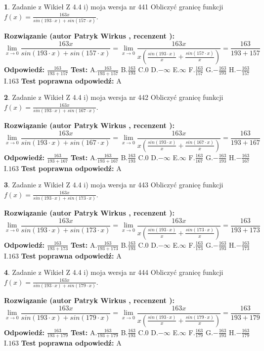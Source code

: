 \documentclass[12pt, a4paper]{article}
\theoremstyle{definition} %
\newtheorem{zad}{}
\newcommand{\zadStart}[1]{\begin{zad}#1\newline}
\newcommand{\zadStop}{\end{zad}}
\newcommand{\rozwStart}[2]{\noindent \textbf{Rozwiązanie (autor #1 , recenzent #2): }\newline}
\newcommand{\rozwStop}{\newline}
\newcommand{\odpStart}{\noindent \textbf{Odpowiedź:}\newline}
\newcommand{\odpStop}{\newline}
\newcommand{\testStart}{\noindent \textbf{Test:}\newline}
\newcommand{\testStop}{\newline}
\newcommand{\kluczStart}{\noindent \textbf{Test poprawna odpowiedź:}\newline}
\newcommand{\kluczStop}{\newline}
\begin{document}
\zadStart{Zadanie z Wikieł Z 4.4 i) moja wersja nr 441}
Obliczyć granicę funkcji $f(x)=\frac{163x}{sin(193\cdot x) +sin(157\cdot x)}$.
\zadStop
\rozwStart{Patryk Wirkus}{}
$$\lim\limits_{x\to 0}\frac{163x}{sin(193\cdot x) +sin(157\cdot x)}=\lim\limits_{x\to 0}\frac{163x}{x(\frac{sin(193\cdot x)}{x}+\frac{sin(157\cdot x)}{x})}=\frac{163}{193+157}$$
\rozwStop
\odpStart
$\frac{163}{193+157}$
\odpStop
\testStart
A.$\frac{163}{193+157}$
B.$\frac{163}{193}$
C.$0$
D.$-\infty$
E.$\infty$
F.$\frac{163}{157}$
G.$-\frac{163}{193}$
H.$-\frac{163}{157}$
I.$163$
\testStop
\kluczStart
A
\kluczStop



\zadStart{Zadanie z Wikieł Z 4.4 i) moja wersja nr 442}
Obliczyć granicę funkcji $f(x)=\frac{163x}{sin(193\cdot x) +sin(167\cdot x)}$.
\zadStop
\rozwStart{Patryk Wirkus}{}
$$\lim\limits_{x\to 0}\frac{163x}{sin(193\cdot x) +sin(167\cdot x)}=\lim\limits_{x\to 0}\frac{163x}{x(\frac{sin(193\cdot x)}{x}+\frac{sin(167\cdot x)}{x})}=\frac{163}{193+167}$$
\rozwStop
\odpStart
$\frac{163}{193+167}$
\odpStop
\testStart
A.$\frac{163}{193+167}$
B.$\frac{163}{193}$
C.$0$
D.$-\infty$
E.$\infty$
F.$\frac{163}{167}$
G.$-\frac{163}{193}$
H.$-\frac{163}{167}$
I.$163$
\testStop
\kluczStart
A
\kluczStop



\zadStart{Zadanie z Wikieł Z 4.4 i) moja wersja nr 443}
Obliczyć granicę funkcji $f(x)=\frac{163x}{sin(193\cdot x) +sin(173\cdot x)}$.
\zadStop
\rozwStart{Patryk Wirkus}{}
$$\lim\limits_{x\to 0}\frac{163x}{sin(193\cdot x) +sin(173\cdot x)}=\lim\limits_{x\to 0}\frac{163x}{x(\frac{sin(193\cdot x)}{x}+\frac{sin(173\cdot x)}{x})}=\frac{163}{193+173}$$
\rozwStop
\odpStart
$\frac{163}{193+173}$
\odpStop
\testStart
A.$\frac{163}{193+173}$
B.$\frac{163}{193}$
C.$0$
D.$-\infty$
E.$\infty$
F.$\frac{163}{173}$
G.$-\frac{163}{193}$
H.$-\frac{163}{173}$
I.$163$
\testStop
\kluczStart
A
\kluczStop



\zadStart{Zadanie z Wikieł Z 4.4 i) moja wersja nr 444}
Obliczyć granicę funkcji $f(x)=\frac{163x}{sin(193\cdot x) +sin(179\cdot x)}$.
\zadStop
\rozwStart{Patryk Wirkus}{}
$$\lim\limits_{x\to 0}\frac{163x}{sin(193\cdot x) +sin(179\cdot x)}=\lim\limits_{x\to 0}\frac{163x}{x(\frac{sin(193\cdot x)}{x}+\frac{sin(179\cdot x)}{x})}=\frac{163}{193+179}$$
\rozwStop
\odpStart
$\frac{163}{193+179}$
\odpStop
\testStart
A.$\frac{163}{193+179}$
B.$\frac{163}{193}$
C.$0$
D.$-\infty$
E.$\infty$
F.$\frac{163}{179}$
G.$-\frac{163}{193}$
H.$-\frac{163}{179}$
I.$163$
\testStop
\kluczStart
A
\kluczStop
\end{document}
